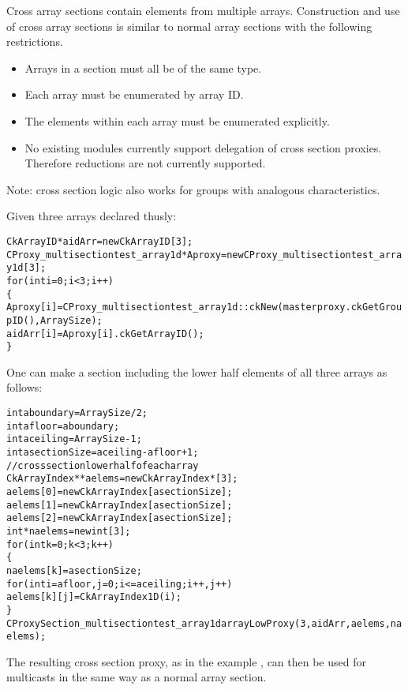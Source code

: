 Cross array sections contain elements from multiple arrays.
Construction and use of cross array sections is similar to normal
array sections with the following restrictions.

\begin{itemize}

\item Arrays in a section must all be of the same type.

\item Each array must be enumerated by array ID.

\item The elements within each array must be enumerated explicitly.

\item No existing modules currently support delegation of cross
  section proxies. Therefore reductions are not currently supported.

\end{itemize}

Note: cross section logic also works for groups with analogous characteristics.

Given three arrays declared thusly:

\begin{alltt}
	  CkArrayID *aidArr= new CkArrayID[3];
	  CProxy\_multisectiontest\_array1d *Aproxy= new CProxy\_multisectiontest\_array1d[3];
	  for(int i=0;i<3;i++)
	    \{
	      Aproxy[i]=CProxy\_multisectiontest\_array1d::ckNew(masterproxy.ckGetGroupID(),ArraySize);	  
	      aidArr[i]=Aproxy[i].ckGetArrayID();
	    \}
\end{alltt}

One can make a section including the  lower half elements of all three
arrays as follows:

\begin{alltt}
	  int aboundary=ArraySize/2;
	  int afloor=aboundary;
	  int aceiling=ArraySize-1;
	  int asectionSize=aceiling-afloor+1;
	  // cross section lower half of each array
	  CkArrayIndex **aelems= new CkArrayIndex*[3];
	  aelems[0]= new CkArrayIndex[asectionSize];
	  aelems[1]= new CkArrayIndex[asectionSize];
	  aelems[2]= new CkArrayIndex[asectionSize];
	  int *naelems=new int[3];
	  for(int k=0;k<3;k++)
	    \{
	      naelems[k]=asectionSize;
	      for(int i=afloor,j=0;i<=aceiling;i++,j++)
	        aelems[k][j]=CkArrayIndex1D(i);
	    \}
	  CProxySection\_multisectiontest\_array1d arrayLowProxy(3,aidArr,aelems,naelems);
\end{alltt}

The resulting cross section proxy, as in the example ,
can then be used for multicasts in the same way as a normal array
section.

